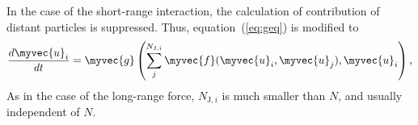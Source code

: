 In the case of the short-range interaction, the calculation of
contribution of distant particles is suppressed. Thus,
equation~(\ref{eq:geq}) is modified to
\begin{align}
  \frac{d\myvec{u}_i}{dt} = \myvec{g}\left(\sum_j^{N_{\mathrm{J},i}}
  \myvec{f}(\myvec{u}_i,\myvec{u}_j), \myvec{u}_i
  \right), \label{eq:geqS}
\end{align}
As in the case of the long-range force, $N_{\mathrm{J},i}$ is much
smaller than $N$, and usually independent of $N$.



